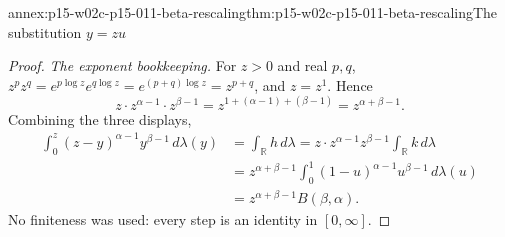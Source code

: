 \begin{annexitem}{annex:p15-w02c-p15-011-beta-rescaling}{thm:p15-w02c-p15-011-beta-rescaling}{The substitution \(y=zu\)}
\begin{proof}
\emph{The exponent bookkeeping.} For \(z>0\) and real \(p,q\),
\(z^pz^q=e^{p\log z}e^{q\log z}=e^{(p+q)\log z}=z^{p+q}\), and \(z=z^1\).
Hence
\[
 z\cdot z^{\alpha-1}\cdot z^{\beta-1}
   =z^{1+(\alpha-1)+(\beta-1)}=z^{\alpha+\beta-1}.
\]
Combining the three displays,
\[
 \begin{aligned}
 \int_0^z(z-y)^{\alpha-1}y^{\beta-1}\,d\lambda(y)
  &=\int_{\mathbb R}h\,d\lambda
   =z\cdot z^{\alpha-1}z^{\beta-1}\int_{\mathbb R}k\,d\lambda\\
  &=z^{\alpha+\beta-1}\int_0^1(1-u)^{\alpha-1}u^{\beta-1}\,d\lambda(u)\\
  &=z^{\alpha+\beta-1}B(\beta,\alpha).
 \end{aligned}
\]
No finiteness was used: every step is an identity in \([0,\infty]\).
\end{proof}
\end{annexitem}

